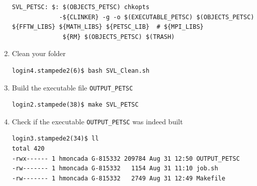 \documentclass{article}
\begin{document}
\begin{enumerate}
\begin{verbatim}
SVL_PETSC: $: $(OBJECTS_PETSC) chkopts
             -${CLINKER} -g -o $(EXECUTABLE_PETSC) $(OBJECTS_PETSC) ${FFTW_LIBS} ${MATH_LIBS} ${PETSC_LIB}  # ${MPI_LIBS} 
              ${RM} $(OBJECTS_PETSC) $(TRASH)
\end{verbatim}
\normalsize
\item Clean your folder
\scriptsize
\begin{verbatim}
login4.stampede2(6)$ bash SVL_Clean.sh 
\end{verbatim}
\normalsize
\item Build the executable file \verb+OUTPUT_PETSC+
\scriptsize
\begin{verbatim}
login2.stampede(38)$ make SVL_PETSC
\end{verbatim}
\normalsize
\item Check if the executable \verb+OUTPUT_PETSC+ was indeed built
\scriptsize
\begin{verbatim}
login3.stampede2(34)$ ll
total 420
-rwx------ 1 hmoncada G-815332 209784 Aug 31 12:50 OUTPUT_PETSC
-rw------- 1 hmoncada G-815332   1154 Aug 31 11:10 job.sh
-rw------- 1 hmoncada G-815332   2749 Aug 31 12:49 Makefile
\end{verbatim}
\normalsize
\end{enumerate}
\end{document}
